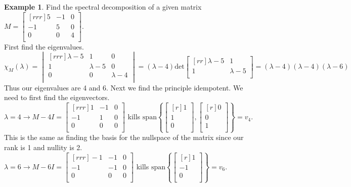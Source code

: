 \documentclass{report}
\theoremstyle{plain}
\theoremstyle{definition}
\newtheorem*{ex}{Example}
\theoremstyle{plain}
\begin{document}
\begin{ex}
Find the spectral decomposition of a given matrix $M=\begin{bmatrix}[rrr]5&-1&0\\-1&5&0\\0&0&4\\\end{bmatrix}$.\\
First find the eigenvalues.
\[ \chi_M(\lambda) = \begin{vmatrix}[rrr]\lambda-5&1&0\\1&\lambda-5&0\\0&0&\lambda-4\\\end{vmatrix} = (\lambda-4)\mathrm{det}\begin{bmatrix}[rr]\lambda-5&1\\1&\lambda-5\\\end{bmatrix} = (\lambda-4)(\lambda-4)(\lambda-6) \]
Thus our eigenvalues are 4 and 6. Next we find the principle idempotent. We need to first find the eigenvectors.\\
$\lambda=4\rightarrow M-4I=\begin{bmatrix}[rrr]1&-1&0\\-1&1&0\\0&0&0\\\end{bmatrix}$ kills $\mathrm{span}\left\{ \begin{bmatrix}[r]1\\1\\0\\\end{bmatrix},\begin{bmatrix}[r]0\\0\\1\\\end{bmatrix}\right\} = v_4$. This is the same as finding the basis for the nullspace of the matrix since our rank is 1 and nullity is 2.\\
$\lambda=6\rightarrow M-6I=\begin{bmatrix}[rrr]-1&-1&0\\-1&-1&0\\0&0&0\\\end{bmatrix}$ kills $\mathrm{span}\left\{\begin{bmatrix}[r]1\\-1\\0\\\end{bmatrix}\right\} = v_6$.\\

\end{ex}
\end{document}
